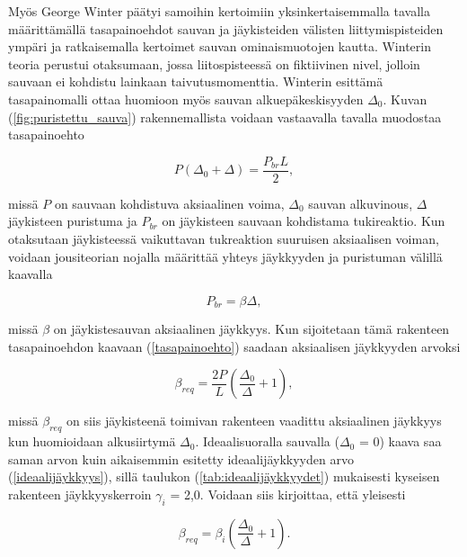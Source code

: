 \documentclass[12pt]{article}
\newenvironment{content}{\pagenumbering{arabic}}{}
\begin{document}
\begin{content}
Myös George Winter päätyi samoihin kertoimiin \parencite{winter} yksinkertaisemmalla tavalla määrittämällä tasapainoehdot sauvan ja jäykisteiden välisten liittymispisteiden ympäri ja ratkaisemalla kertoimet sauvan ominaismuotojen kautta. Winterin teoria perustui otaksumaan, jossa liitospisteessä on fiktiivinen nivel, jolloin sauvaan ei kohdistu lainkaan taivutusmomenttia. Winterin esittämä tasapainomalli ottaa huomioon myös sauvan alkuepäkeskisyyden $\Delta_0$. Kuvan (\ref{fig:puristettu_sauva}) rakennemallista voidaan vastaavalla tavalla muodostaa tasapainoehto

\begin{equation}
\label{tasapainoehto}
P (\Delta_0 + \Delta) = \frac{P_{br} L}{2},
\end{equation}

missä $P$ on sauvaan kohdistuva aksiaalinen voima, $\Delta_0$ sauvan alkuvinous, $\Delta$ jäykisteen puristuma ja $P_{br}$ on jäykisteen sauvaan kohdistama tukireaktio. Kun otaksutaan jäykisteessä vaikuttavan tukreaktion suuruisen aksiaalisen voiman, voidaan jousiteorian nojalla määrittää yhteys jäykkyyden ja puristuman välillä kaavalla

\begin{equation}
\label{jousiteoria}
P_{br} = \beta \Delta,
\end{equation}

missä $\beta$ on jäykistesauvan aksiaalinen jäykkyys. Kun sijoitetaan tämä rakenteen tasapainoehdon kaavaan (\ref{tasapainoehto}) saadaan aksiaalisen jäykkyyden arvoksi

\begin{equation}
\label{breq}
\beta_{req} = \frac{2 P}{L} (\frac{\Delta_0}{\Delta} + 1),
\end{equation}

missä $\beta_{req}$ on siis jäykisteenä toimivan rakenteen vaadittu aksiaalinen jäykkyys kun huomioidaan alkusiirtymä $\Delta_0$. Ideaalisuoralla sauvalla ($\Delta_0$ = 0) kaava saa saman arvon kuin aikaisemmin esitetty ideaalijäykkyyden arvo (\ref{ideaalijäykkyys}), sillä taulukon (\ref{tab:ideaalijäykkyydet}) mukaisesti kyseisen rakenteen jäykkyyskerroin $\gamma_i$ = 2,0. Voidaan siis kirjoittaa, että yleisesti

\begin{equation}
\label{breq_2}
\beta_{req} = \beta_i (\frac{\Delta_0}{\Delta} + 1).
\end{equation}







\end{content}
\end{document}
